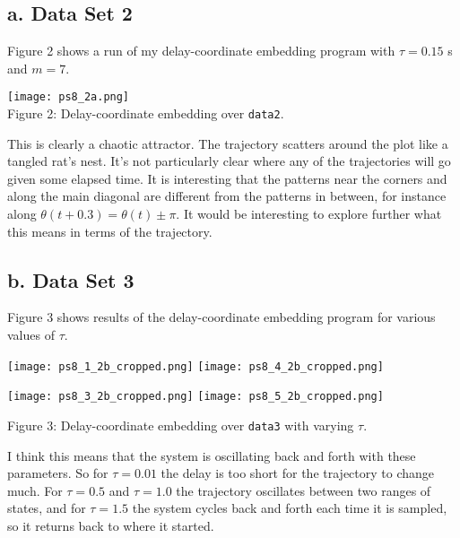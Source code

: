 \documentclass[12pt, letterpaper]{article}
\begin{document}
\subsection*{a. Data Set 2}

Figure 2 shows a run of my delay-coordinate embedding program with $\tau=0.15$ s 
and $m=7$. 

\begin{center}
\texttt{[image: ps8\_2a.png]}
\\
Figure 2: Delay-coordinate embedding over \texttt{data2}.
\end{center}

This is clearly a chaotic attractor. The trajectory scatters around the plot like 
a tangled rat's nest. It's not particularly clear where any of the trajectories 
will go given some elapsed time. It is interesting that the patterns near the 
corners and along the main diagonal are different from the patterns in between, 
for instance along $\theta(t+0.3) = \theta(t)\pm\pi$. It would be interesting to
explore further what this means in terms of the trajectory.

\subsection*{b. Data Set 3}

Figure 3 shows results of the delay-coordinate embedding program for various 
values of $\tau$. 

\begin{minipage}[t]{0.5\textwidth}
\begin{center}
\texttt{[image: ps8\_1\_2b\_cropped.png]}
\texttt{[image: ps8\_4\_2b\_cropped.png]}
\end{center}
\end{minipage}
\begin{minipage}[t]{0.5\textwidth}
\begin{center}
\texttt{[image: ps8\_3\_2b\_cropped.png]}
\texttt{[image: ps8\_5\_2b\_cropped.png]}
\end{center}
\end{minipage}
\begin{center}
Figure 3: Delay-coordinate embedding over \texttt{data3} with varying $\tau$.
\\
\end{center}

I think this means that the system is oscillating back and forth with these
parameters. So for $\tau=0.01$ the delay is too short for the trajectory to 
change much. For $\tau=0.5$ and $\tau=1.0$ the trajectory oscillates between 
two ranges of states, and for $\tau=1.5$ the system cycles back and forth each
time it is sampled, so it returns back to where it started.
\end{document}
